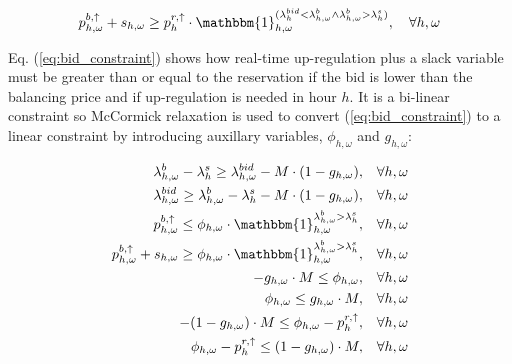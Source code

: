 \begin{equation}\label{eq:bid_constraint}
    p^{b, \uparrow}_{h,\omega} + s_{h,\omega} \geq p^{r,\uparrow}_{h} \cdot \mathbbm{1}_{h,\omega}^{(\lambda^{bid}_{h} < \lambda^{b}_{h,\omega} \land \lambda^{b}_{h,\omega} > \lambda^{s}_{h})}, \quad \forall{h,\omega}
\end{equation}

Eq. (\ref{eq:bid_constraint}) shows how real-time up-regulation plus a slack variable must be greater than or equal to the reservation if the bid is lower than the balancing price and if up-regulation is needed in hour $h$. It is a bi-linear constraint so McCormick relaxation \cite{mccormick1976computability} is used to convert (\ref{eq:bid_constraint}) to a linear constraint by introducing auxillary variables, $\phi_{h,\omega}$ and $g_{h,\omega}$:

\begin{subequations}\label{eq:bid_constraint_relaxed}
    \begin{align}
        \lambda_{h,\omega}^{b} - \lambda_{h}^{s} \geq \lambda_{h,\omega}^{bid} - M \cdot (1 - g_{h,\omega}) , \quad                                   & \forall{h,\omega}             \label{con_bid:subeq1} \\
        \lambda_{h,\omega}^{bid} \geq \lambda_{h,\omega}^{b} - \lambda_{h}^{s} - M \cdot (1 - g_{h,\omega}) , \quad                                   & \forall{h,\omega}             \label{con_bid:subeq2} \\
        p^{b, \uparrow}_{h,\omega} \leq \phi_{h,\omega} \cdot \mathbbm{1}_{h,\omega}^{\lambda^{b}_{h,\omega} > \lambda^{s}_{h}}, \quad                & \forall{{h,\omega}}           \label{con_bid:subeq3} \\
        p^{b, \uparrow}_{h,\omega} + s_{h,\omega} \geq \phi_{h,\omega} \cdot \mathbbm{1}_{h,\omega}^{\lambda^{b}_{h,\omega} > \lambda^{s}_{h}}, \quad & \forall{{h,\omega}}           \label{con_bid:subeq4} \\
        -g_{h,\omega} \cdot M \leq \phi_{h,\omega}, \quad                                                                                             & \forall{h,\omega}             \label{con_bid:subeq5} \\
        \phi_{h,\omega} \leq g_{h,\omega} \cdot M, \quad                                                                                              & \forall{h,\omega}             \label{con_bid:subeq6} \\
        -(1 - g_{h,\omega}) \cdot M \leq \phi_{h,\omega} - p^{r,\uparrow}_{h}, \quad                                                                  & \forall{h,\omega}             \label{con_bid:subeq7} \\
        \phi_{h,\omega} - p^{r,\uparrow}_{h} \leq (1 - g_{h,\omega}) \cdot M, \quad                                                                   & \forall{h,\omega}             \label{con_bid:subeq8}
    \end{align}
\end{subequations}

